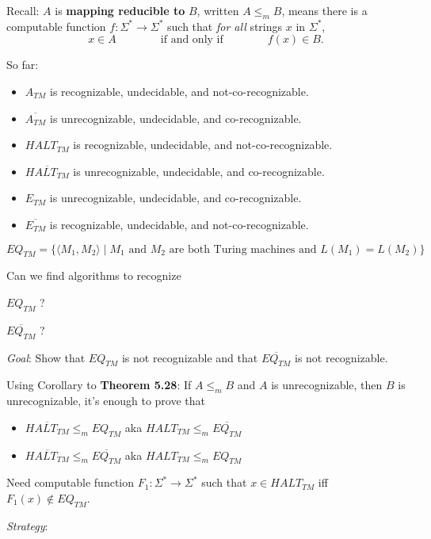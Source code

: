 \documentclass[12pt, oneside]{article}
\begin{document}
Recall:  $A$ is  {\bf  mapping  reducible to} $B$, written $A \leq_m B$,  means there is a computable function 
$f : \Sigma^* \to \Sigma^*$ such that {\it for all} strings  $x$ in $\Sigma^*$, 
\[
x  \in  A \qquad \qquad \text{if and  only  if} \qquad \qquad f(x) \in B.
\]

So far: 
\begin{itemize}
\item $A_{TM}$ is recognizable, undecidable, and not-co-recognizable.
\item $\overline{A_{TM}}$ is unrecognizable, undecidable, and co-recognizable.
\item $HALT_{TM}$ is recognizable, undecidable, and not-co-recognizable.
\item $\overline{HALT_{TM}}$ is unrecognizable, undecidable, and co-recognizable.
\item $E_{TM}$ is unrecognizable, undecidable, and co-recognizable.
\item $\overline{E_{TM}}$ is recognizable, undecidable, and not-co-recognizable.
\end{itemize}


\[
EQ_{TM} = \{ \langle M_1, M_2 \rangle \mid \text{$M_1$ and $M_2$ are both Turing machines and $L(M_1) =L(M_2)$} \}
\]


Can we find algorithms to recognize

$EQ_{TM}$  ? 

$\overline{EQ_{TM}}$ ? 

\vfill

{\it Goal}: Show that $EQ_{TM}$ is not recognizable and that $\overline{EQ_{TM}}$ is not recognizable.

Using Corollary to {\bf Theorem 5.28}: If  $A \leq_m B$ and $A$ is unrecognizable, then $B$ is unrecognizable,
it's enough to prove that 
\begin{itemize}
    \item[] $\overline{HALT_{TM}} \leq_m EQ_{TM}$ \hfill aka $HALT_{TM} \leq_m \overline{EQ_{TM}}$
    \item[] $\overline{HALT_{TM}}  \leq_m \overline{EQ_{TM}}$ \hfill aka $HALT_{TM} \leq_m EQ_{TM}$
\end{itemize}

\vfill

\newpage 
Need computable function  $F_1: \Sigma^* \to \Sigma^*$  such that  $x \in HALT_{TM}$ iff 
$F_1(x)  \notin  EQ_{TM}$.



{\it Strategy}:
\end{document}
